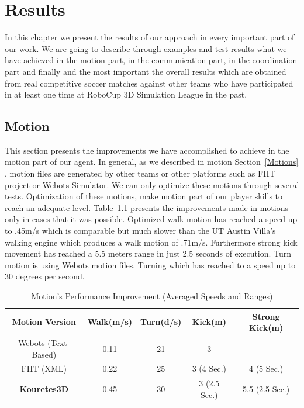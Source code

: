 \chapter{Results}
\label{results}
In this chapter we present the results of our approach in every important part of our work. We are going to describe through examples and test results what we have achieved in the motion part, in the communication part, in the coordination part and finally and the most important the overall results which are obtained from real competitive soccer matches against other teams who have participated in at least one time at RoboCup 3D Simulation League in the past.


\section{Motion}
This section presents the improvements we have accomplished to achieve in the motion part of our agent. In general, as we described in motion Section~\ref{Motions} , motion files are generated by other teams or other platforms such as FIIT project or Webots Simulator. We can only optimize these motions through several tests. Optimization of these motions, make motion part of our player skills to reach an adequate level. Table~\ref{MotionImprovements} presents the improvements made in motions only in cases that it was possible. Optimized walk motion has reached a speed up to .45m/s which is comparable but much slower than the UT Austin Villa's walking engine which produces a walk motion of .71m/s. Furthermore strong kick movement has reached a 5.5 meters range in just 2.5 seconds of execution. Turn motion is using Webots motion files. Turning which has reached to a speed up to 30 degrees per second. 

\begin{table}[t!]
\caption{Motion's Performance Improvement (Averaged Speeds and Ranges)}
\label{MotionImprovements}
\begin{center}
\begin{small}
\begin{tabular}{ccccc}
\textbf{Motion Version} & \textbf{Walk(m/s)}	& \textbf{Turn(d/s)}	& \textbf{Kick(m)}&\textbf{Strong Kick(m)} \\
\midrule
Webots (Text-Based) 		& 0.11 				& 21 				& 3 				& - \\
FIIT (XML)				& 0.22 				& 25 				& 3 (4 Sec.) 		& 4 (5 Sec.) \\
\textbf{Kouretes3D} 		& 0.45 	& 30 		& 3 (2.5 Sec.)& 5.5 (2.5 Sec.) \\
\end{tabular}
\end{small}
\end{center}
\end{table}




